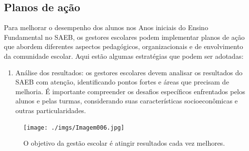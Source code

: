 \subsection{Planos de ação}\label{planos-de-auxe7uxe3o}

Para melhorar o desempenho dos alunos nos Anos iniciais do Ensino
Fundamental no SAEB, os gestores escolares podem implementar planos de
ação que abordem diferentes aspectos pedagógicos, organizacionais e de
envolvimento da comunidade escolar. Aqui estão algumas estratégias que
podem ser adotadas:

\begin{enumerate}
\def\labelenumi{\arabic{enumi}.}
\tightlist
\item
  Análise dos resultados: os gestores escolares devem analisar os
  resultados do SAEB com atenção, identificando pontos fortes e áreas
  que precisam de melhoria. É importante compreender os desafios
  específicos enfrentados pelos alunos e pelas turmas, considerando suas
  características socioeconômicas e outras particularidades.
\end{enumerate}

\begin{figure}
\centering
\texttt{[image: ./imgs/Imagem006.jpg]}
\caption{O objetivo da gestão escolar é atingir resultados cada vez
melhores.}
\end{figure}

